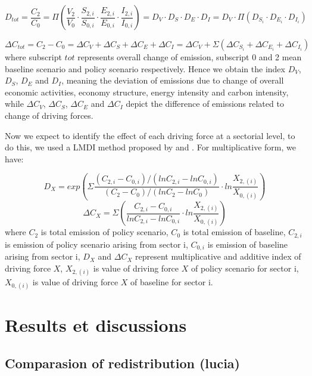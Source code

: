 \documentclass[
]{article}
\begin{document}
\[ D_{tot} =\frac{C_{2}}{C_{0}} = \Pi(\frac{V_{2}}{V_{0}} \cdot \frac{S_{2,i}}{S_{0,i}} \cdot \frac{E_{2,i}}{E_{0,i}}  \cdot \frac{I_{2,i}}{I_{0,i}}) = D_{V}  \cdot  D_{S} \cdot D_{E} \cdot D_{I} = D_{V}  \cdot \Pi ( D_{S_{i}} \cdot D_{E_{i}} \cdot D_{I_{i}}) \tag{3}\]

\[ \Delta C_{tot} = C_{2} - C_{0} = \Delta C_{V} + \Delta C_{S} + \Delta C_{E} + \Delta C_{I} = \Delta C_{V} + \Sigma( \Delta C_{S_{i}} + \Delta C_{E_{i}} + \Delta C_{I_{i}}) \tag{4}\]
where subscript \(tot\) represents overall change of emission, subscript
0 and 2 mean baseline scenario and policy scenario respectively. Hence
we obtain the index \(D_{V}\), \(D_{S}\), \(D_{E}\) and \(D_{I}\),
meaning the deviation of emissions due to change of overall economic
activities, economy structure, energy intensity and carbon intensity,
while \(\Delta C_{V}\), \(\Delta C_{S}\), \(\Delta C_{E}\) and
\(\Delta C_{I}\) depict the difference of emissions related to change of
driving forces.

Now we expect to identify the effect of each driving force at a
sectorial level, to do this, we used a LMDI method proposed by
\textcite{ang1997} and \textcite{ang2005}. For multiplicative form, we
have:

\[ D_{X} = exp ( \Sigma \frac{(C_{2,i}-C_{0,i})/(lnC_{2,i}-lnC_{0,i})}{(C_{2}-C_{0})/(lnC_{2}-lnC_{0})} \cdot ln \frac{X_{2,(i)}}{X_{0,(i)}} ) \tag{11}\]
\[ \Delta C_{X} =  \Sigma (\frac{C_{2,i}-C_{0,i}}{lnC_{2,i}-lnC_{0,i}} \cdot ln\frac{X_{2,(i)}}{X_{0,(i)}}) \tag{12} \]
where \(C_{2}\) is total emission of policy scenario, \(C_{0}\) is total
emission of baseline, \(C_{2,i}\) is emission of policy scenario arising
from sector i, \(C_{0,i}\) is emission of baseline arising from sector
i, \(D_{X}\) and \(\Delta C_{X}\) represent multiplicative and additive
index of driving force \(X\), \(X_{2,(i)}\) is value of driving force
\(X\) of policy scenario for sector i, \(X_{0,(i)}\) is value of driving
force \(X\) of baseline for sector i.

\hypertarget{results-et-discussions}{%
\section{Results et discussions}\label{results-et-discussions}}

\hypertarget{comparasion-of-redistribution-lucia}{%
\subsection{Comparasion of redistribution
(lucia)}\label{comparasion-of-redistribution-lucia}}
\end{document}
